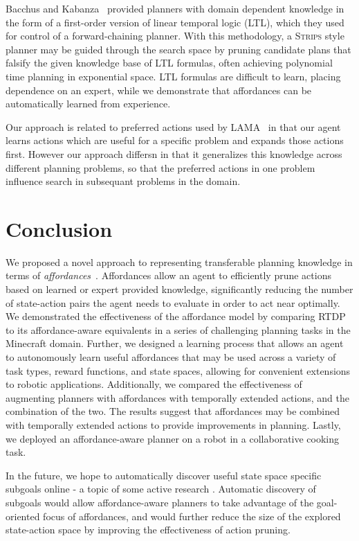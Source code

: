 \documentclass[letterpaper]{article}
\begin{document}
Bacchus and
Kabanza~\cite{Bacchus95usingtemporal,Bacchus99usingtemporal} provided
planners with domain dependent knowledge in the form of a first-order
version of linear temporal logic (LTL), which they used for control of
a forward-chaining planner. With this methodology, a \textsc{Strips}
style planner may be guided through the search space by pruning
candidate plans that falsify the given knowledge base of LTL formulas,
often achieving polynomial time planning in exponential space.  LTL
formulas are difficult to learn, placing dependence on an expert,
while we demonstrate that affordances can be automatically learned
from experience.

Our approach is related to preferred actions used by
LAMA~\citep{richter10} in that our agent learns actions which are
useful for a specific problem and expands those actions first.
However our approach differsn in that it generalizes this knowledge
across different planning problems, so that the preferred actions in
one problem influence search in subsequant problems in the domain.



\section{Conclusion}
\label{sec:conclusion}
We proposed a novel approach to representing transferable planning
knowledge in terms of {\em affordances}~\cite{gibson77}. Affordances
allow an agent to efficiently prune actions based on learned or expert
provided knowledge, significantly reducing the number of state-action
pairs the agent needs to evaluate in order to act near optimally. We
demonstrated the effectiveness of the affordance model by comparing
RTDP to its affordance-aware equivalents in a series of challenging
planning tasks in the Minecraft domain. Further, we designed a
learning process that allows an agent to autonomously learn useful
affordances that may be used across a variety of task types, reward
functions, and state spaces, allowing for convenient extensions to
robotic applications.  Additionally, we compared the effectiveness of
augmenting planners with affordances with temporally extended actions,
and the combination of the two. The results suggest that affordances
may be combined with temporally extended actions to provide
improvements in planning.  Lastly, we deployed an affordance-aware
planner on a robot in a collaborative cooking task.

In the future, we hope to automatically discover useful state space
specific subgoals online - a topic of some active research
\cite{Mcgovern01automaticdiscovery,Simsek:2005:IUS:1102351.1102454}.
Automatic discovery of subgoals would allow affordance-aware planners
to take advantage of the goal-oriented focus of affordances, and would
further reduce the size of the explored state-action space by
improving the effectiveness of action pruning.
\end{document}
